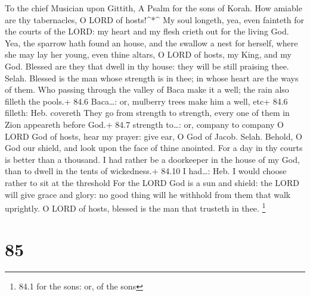 To the chief Musician upon Gittith, A Psalm for the sons of Korah.
 How amiable are thy tabernacles, O LORD of hosts!\^{}*\^{}
 My soul longeth, yea, even fainteth for the courts of the
LORD: my heart and my flesh crieth out for the living God. 
Yea, the sparrow hath found an house, and the swallow a nest for
herself, where she may lay her young, even thine altars, O LORD of
hosts, my King, and my God.  Blessed are they that dwell in
thy house: they will be still praising thee. Selah.  Blessed
is the man whose strength is in thee; in whose heart are the ways of
them.  Who passing through the valley of Baca make it a
well; the rain also filleth the pools.+ 84.6 Baca\ldots: or, mulberry
trees make him a well, etc+ 84.6 filleth: Heb. covereth 
They go from strength to strength, every one of them in Zion appeareth
before God.+ 84.7 strength to\ldots: or, company to company 
O LORD God of hosts, hear my prayer: give ear, O God of Jacob. Selah.
 Behold, O God our shield, and look upon the face of thine
anointed.  For a day in thy courts is better than a
thousand. I had rather be a doorkeeper in the house of my God, than to
dwell in the tents of wickedness.+ 84.10 I had\ldots: Heb. I would
choose rather to sit at the threshold  For the LORD God is
a sun and shield: the LORD will give grace and glory: no good thing will
he withhold from them that walk uprightly.  O LORD of
hosts, blessed is the man that trusteth in thee. \footnote{84.1 for the
  sons: or, of the sons}

\hypertarget{section-84}{%
\section{85}\label{section-84}}

